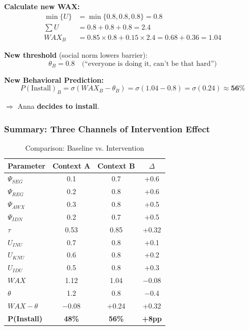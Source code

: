 \textbf{Calculate new WAX:}
\begin{align}
\min\{U\} &= \min\{0.8, 0.8, 0.8\} = 0.8 \\
\sum U &= 0.8 + 0.8 + 0.8 = 2.4 \\
WAX_B &= 0.85 \times 0.8 + 0.15 \times 2.4 = 0.68 + 0.36 = \mathbf{1.04}
\end{align}

\textbf{New threshold} (social norm lowers barrier):
\begin{equation}
\theta_B = 0.8 \quad \text{(``everyone is doing it, can't be that hard'')}
\end{equation}

\textbf{New Behavioral Prediction:}
\begin{equation}
P(\text{Install})_B = \sigma(WAX_B - \theta_B) = \sigma(1.04 - 0.8) = \sigma(0.24) \approx \mathbf{56\%}
\end{equation}

$\Rightarrow$ Anna \textbf{decides to install}.

\subsubsection{Summary: Three Channels of Intervention Effect}

\begin{table}[htbp]
\centering
\caption{Comparison: Baseline vs. Intervention}
\renewcommand{\arraystretch}{1.1}
\begin{tabular}{@{}lccc@{}}
\toprule
\textbf{Parameter} & \textbf{Context A} & \textbf{Context B} & \textbf{$\Delta$} \\
\midrule
$\Psi_{SEG}$ & 0.1 & 0.7 & +0.6 \\
$\Psi_{REG}$ & 0.2 & 0.8 & +0.6 \\
$\Psi_{AWX}$ & 0.3 & 0.8 & +0.5 \\
$\Psi_{IDN}$ & 0.2 & 0.7 & +0.5 \\
\midrule
$\tau$ & 0.53 & 0.85 & +0.32 \\
\midrule
$U_{INU}$ & 0.7 & 0.8 & +0.1 \\
$U_{KNU}$ & 0.6 & 0.8 & +0.2 \\
$U_{IDU}$ & 0.5 & 0.8 & +0.3 \\
\midrule
$WAX$ & 1.12 & 1.04 & $-$0.08 \\
$\theta$ & 1.2 & 0.8 & $-$0.4 \\
$WAX - \theta$ & $-$0.08 & +0.24 & +0.32 \\
\midrule
\textbf{P(Install)} & \textbf{48\%} & \textbf{56\%} & \textbf{+8pp} \\
\bottomrule
\end{tabular}
\end{table}

